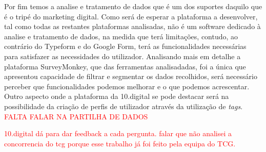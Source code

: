 
Por fim temos a analise e tratamento de dados que é um dos suportes daquilo que é o tripé do marketing digital. Como será de esperar a plataforma a desenvolver, tal como todas as restantes plataformas analisadas, não é um software dedicado à analise e tratamento de dados, na medida que terá limitações, contudo, ao contrário do Typeform e do Google Form, terá as funcionalidades necessárias para satisfazer as necessidades do utilizador. Analisando mais em detalhe a plataforma SurveyMonkey, que das ferramentas analisadadas, foi a única que apresentou capacidade de filtrar e segmentar os dados recolhidos, será necessário perceber que funcionalidades podemos melhorar e o que podemos acrescentar. Outro aspecto onde a plataforma da 10.digital se pode destacar será na possibilidade da criação de perfis de utilizador através da utilização de \textit{tags}. 
\textcolor{red}{ FALTA FALAR NA PARTILHA DE DADOS}

\textcolor{red}{
10.digital dá para dar feedback a cada pergunta.
falar que não analisei a concorrencia do tcg porque esse trabalho já foi feito pela equipa do TCG.
}




